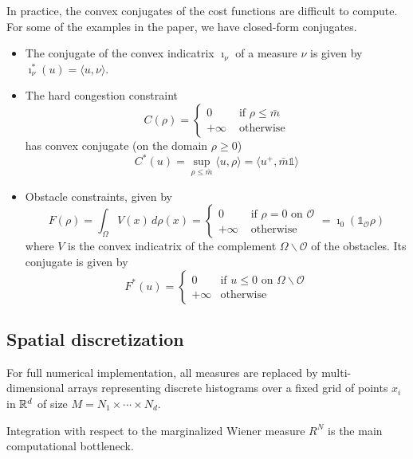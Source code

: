 \documentclass[../report.tex]{subfiles}
\begin{document}
\begin{remark}\label{rem:ConvexConj}
	In practice, the convex conjugates of the cost functions are difficult to compute. For some of the examples in the paper, we have closed-form conjugates.
	\begin{itemize}
		\item The conjugate of the convex indicatrix $\imath_{\nu}$ of a measure $\nu$ is given by $\imath_{\nu}^*(u) = \langle u, \nu\rangle$.
		\item The hard congestion constraint
		\[
		C(\rho) = \begin{cases}
		0&\text{ if }\rho\leq \bar{m} \\
		+\infty&\text{ otherwise}
		\end{cases}
		\]
		has convex conjugate (on the domain $\rho \geq 0$)
		\[
		C^*(u) = \sup_{\rho\leq \bar{m}}{} \langle u, \rho\rangle = \langle u^{+}, \bar{m}\mathds{1}\rangle
		\]
		\item Obstacle constraints, given by
		\[
		F(\rho) = \int_\Omega V(x)\,d\rho(x) =
		\begin{cases}
		0 & \mbox{ if } \rho = 0\text{ on }\mathscr{O} \\
		+\infty & \mbox{ otherwise}
		\end{cases}
		= \imath_{0}(\mathds{1}_{\mathscr{O}}\rho)
		\]
		where $V$ is the convex indicatrix of the complement $\Omega\backslash\mathscr{O}$ of the obstacles. Its conjugate is given by
		\[
		F^*(u) =
		\begin{cases}
		0& \mbox{if } u \leq 0\text{ on } \Omega\backslash\mathscr{O} \\
		+\infty& \mbox{otherwise}
		\end{cases}
		\]
	\end{itemize}
\end{remark}



\subsection{Spatial discretization}\label{sec:PartialDiscret}

For full numerical implementation, all measures are replaced by multi-dimensional arrays representing discrete histograms over a fixed grid of points $x_i$ in $\mathbb{R}^d$ of size $M = N_1\times\cdots\times N_d$.

Integration with respect to the marginalized Wiener measure $R^N$ is the main computational bottleneck. 
\end{document}

